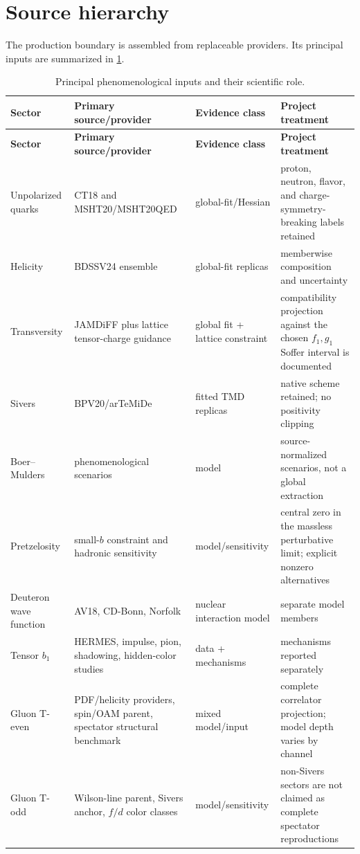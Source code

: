 \documentclass[11pt,oneside]{book}
\begin{document}
\section{Source hierarchy}

The production boundary is assembled from replaceable providers.  Its principal inputs are summarized in \cref{tab:phenomenology-sources}.

\begin{longtable}{@{}p{}p{}p{}p{}@{}}
\caption{Principal phenomenological inputs and their scientific role.}\label{tab:phenomenology-sources}\\
\toprule
\textbf{Sector}&\textbf{Primary source/provider}&\textbf{Evidence class}&\textbf{Project treatment}\\
\midrule
\endfirsthead
\toprule
\textbf{Sector}&\textbf{Primary source/provider}&\textbf{Evidence class}&\textbf{Project treatment}\\
\midrule
\endhead
Unpolarized quarks & CT18 and MSHT20/MSHT20QED \cite{HouEtAl2021CT18,BaileyEtAl2021MSHT20,CridgeEtAl2022MSHT20QED} & global-fit/Hessian & proton, neutron, flavor, and charge-symmetry-breaking labels retained\\
Helicity & BDSSV24 ensemble \cite{BorsaEtAl2024BDSSV} & global-fit replicas & memberwise composition and uncertainty\\
Transversity & JAMDiFF plus lattice tensor-charge guidance \cite{CocuzzaEtAl2024} & global fit + lattice constraint & compatibility projection against the chosen $f_1,g_1$ Soffer interval is documented\\
Sivers & BPV20/arTeMiDe \cite{BuryProkudinVladimirov2021} & fitted TMD replicas & native scheme retained; no positivity clipping\\
Boer--Mulders & phenomenological scenarios & model & source-normalized scenarios, not a global extraction\\
Pretzelosity & small-$b$ constraint and hadronic sensitivity \cite{ChaiChenMa2019} & model/sensitivity & central zero in the massless perturbative limit; explicit nonzero alternatives\\
Deuteron wave function & AV18, CD-Bonn, Norfolk \cite{WiringaStoksSchiavilla1995,Machleidt2001,Piarulli2016} & nuclear interaction model & separate model members\\
Tensor $b_1$ & HERMES, impulse, pion, shadowing, hidden-color studies \cite{HERMES2005b1,CosynDongKumanoSargsian2017,Miller2014b1} & data + mechanisms & mechanisms reported separately\\
Gluon T-even & PDF/helicity providers, spin/OAM parent, spectator structural benchmark \cite{XieChenLu2026} & mixed model/input & complete correlator projection; model depth varies by channel\\
Gluon T-odd & Wilson-line parent, Sivers anchor, $f/d$ color classes & model/sensitivity & non-Sivers sectors are not claimed as complete spectator reproductions\\
\bottomrule
\end{longtable}
\end{document}
